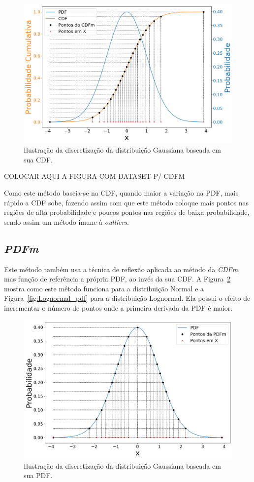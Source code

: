 \begin{figure}[H]
	\centering
	\includegraphics[width=0.8\linewidth]{./figuras/CDFm_normal_1}
	\caption{Ilustração da discretização da distribuição Gaussiana baseada em sua CDF.}
	\label{fig:CDFm_curve}
\end{figure}

\color{red} COLOCAR AQUI A FIGURA COM DATASET P/ CDFM \color{black}

Como este método baseia-se na \ac{CDF}, quando maior a variação na \ac{PDF}, mais rápido a CDF sobe, fazendo assim com que este método coloque mais pontos nas regiões de alta probabilidade e poucos pontos nas regiões de baixa probabilidade, sendo assim um método imune à \textit{outliers}.

\subsection{\textit{PDFm}}
Este método também usa a técnica de reflexão aplicada ao método da \textit{CDFm}, mas função de referência a própria \ac{PDF}, ao invés da sua \ac{CDF}. A Figura~\ref{fig:PDFm_curve} mostra como este método funciona para a distribuição Normal e a Figura~\ref{fig:Lognormal_pdf} para a distribuição Lognormal. Ela possui o efeito de incrementar o número de pontos onde a primeira derivada da \ac{PDF} é maior.

\begin{figure}[H]
	\centering
	\includegraphics[width=0.67\linewidth]{./figuras/PDFm_normal_1}
	\caption{Ilustração da discretização da distribuição Gaussiana baseada em sua PDF.}
	\label{fig:PDFm_curve}
\end{figure}

